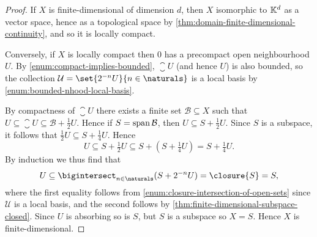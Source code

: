 \documentclass[article, a4paper, 11pt, oneside]{memoir}
\numberwithin{equation}{chapter}
\newcommand{\calB}{\mathcal{B}}
\newcommand{\calU}{\mathcal{U}}
\begin{document}
\begin{proof}
    If $X$ is finite-dimensional of dimension $d$, then $X$ isomorphic to $\mathbb{K}^d$ as a vector space, hence as a topological space by \cref{thm:domain-finite-dimensional-continuity}, and so it is locally compact.

    Conversely, if $X$ is locally compact then $0$ has a precompact open neighbourhood $U$. By \cref{enum:compact-implies-bounded}, $\closure{U}$ (and hence $U$) is also bounded, so the collection $\calU = \set{2^{-n}U}{n \in \naturals}$ is a local basis by \cref{enum:bounded-nhood-local-basis}.

    By compactness of $\closure{U}$ there exists a finite set $\calB \subseteq X$ such that $U \subseteq \closure{U} \subseteq \calB + \frac{1}{2} U$. Hence if $S = \Span\calB$, then $U \subseteq S + \frac{1}{2} U$. Since $S$ is a subspace, it follows that $\frac{1}{2} U \subseteq S + \frac{1}{4} U$. Hence
    \begin{equation*}
        U
            \subseteq S + \tfrac{1}{2} U
            \subseteq S + (S + \tfrac{1}{4} U)
            = S + \tfrac{1}{4} U.
    \end{equation*}
    By induction we thus find that
    \begin{equation*}
        U
            \subseteq \bigintersect_{n \in \naturals} (S + 2^{-n}U)
            = \closure{S}
            = S,
    \end{equation*}
    where the first equality follows from \cref{enum:closure-intersection-of-open-sets} since $\calU$ is a local basis, and the second follows by \cref{thm:finite-dimensional-subspace-closed}.  Since $U$ is absorbing so is $S$, but $S$ is a subspace so $X = S$. Hence $X$ is finite-dimensional.
\end{proof}



\end{document}

